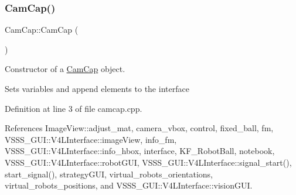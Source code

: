 \subsubsection{\texorpdfstring{Cam\+Cap()}{CamCap()}}
{\footnotesize\ttfamily Cam\+Cap\+::\+Cam\+Cap (\begin{DoxyParamCaption}{ }\end{DoxyParamCaption})}



Constructor of a \hyperlink{class_cam_cap}{Cam\+Cap} object. 

Sets variables and append elements to the interface 

Definition at line 3 of file camcap.\+cpp.



References Image\+View\+::adjust\+\_\+mat, camera\+\_\+vbox, control, fixed\+\_\+ball, fm, V\+S\+S\+S\+\_\+\+G\+U\+I\+::\+V4\+L\+Interface\+::image\+View, info\+\_\+fm, V\+S\+S\+S\+\_\+\+G\+U\+I\+::\+V4\+L\+Interface\+::info\+\_\+hbox, interface, K\+F\+\_\+\+Robot\+Ball, notebook, V\+S\+S\+S\+\_\+\+G\+U\+I\+::\+V4\+L\+Interface\+::robot\+G\+UI, V\+S\+S\+S\+\_\+\+G\+U\+I\+::\+V4\+L\+Interface\+::signal\+\_\+start(), start\+\_\+signal(), strategy\+G\+UI, virtual\+\_\+robots\+\_\+orientations, virtual\+\_\+robots\+\_\+positions, and V\+S\+S\+S\+\_\+\+G\+U\+I\+::\+V4\+L\+Interface\+::vision\+G\+UI.


